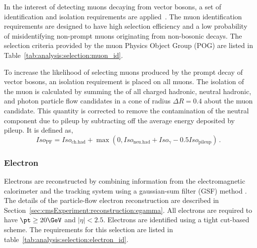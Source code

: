 In the interest of detecting muons decaying from vector bosons, a set of identification and isolation requirements are applied~\cite{Sirunyan:2018fpa}. The muon identification requirements are designed to have high selection efficiency and a low probability of misidentifying non-prompt muons originating from non-bosonic decays. The selection criteria provided by the muon Physics Object Group (POG) are listed in Table~\ref{tab:analysis:selection:muon_id}.



\noindent To increase the likelihood of selecting muons produced by the prompt decay of vector bosons, an isolation requirement is placed on all muons. The isolation of the muon is calculated by summing the \pt of all charged hadronic, neutral hadronic, and photon particle flow candidates in a cone of radius $\Delta R = 0.4$ about the muon candidate. This quantity is corrected to remove the contamination of the neutral component due to pileup by subtracting off the average energy deposited by pileup. It is defined as,
\begin{equation*} 
    Iso_\mathrm{PF} = Iso_\mathrm{ ch. had} + \max\left(0, Iso_\mathrm{ neu. had} + Iso_{\gamma} - 0.5 Iso_\mathrm{ pileup}\right)\,.
\end{equation*}








\subsubsection{Electron}

Electrons are reconstructed by combining information from the electromagnetic calorimeter and the tracking system using a gaussian-sum filter (GSF) method \cite{Baffioni:2006cd}. The details of the particle-flow electron reconstruction are described in Section~\ref{sec:cmsExperiment:reconstruction:egamma}. All electrons are required to have $\pt \geq 20 \GeV$ and $|\eta| < 2.5$.  Electrons are identified using a tight cut-based scheme. The requirements for this selection are listed in table~\ref{tab:analysis:selection:electron_id}.



